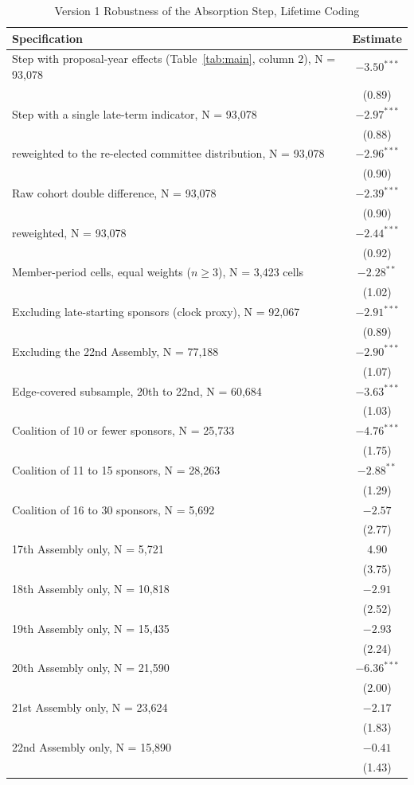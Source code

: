 \documentclass[11pt]{article}
\begin{document}
\begin{table}[H]
\centering
\singlespacing
\caption{Version 1 Robustness of the Absorption Step, Lifetime Coding}
\label{tab:robust}
\small
\begin{tabular}{lc}
\toprule
Specification & Estimate \\
\midrule
Step with proposal-year effects (Table~\ref{tab:main}, column 2), N = 93,078 & $-3.50^{***}$ \\
& (0.89) \\
Step with a single late-term indicator, N = 93,078 & $-2.97^{***}$ \\
& (0.88) \\
\quad reweighted to the re-elected committee distribution, N = 93,078 & $-2.96^{***}$ \\
& (0.90) \\
Raw cohort double difference, N = 93,078 & $-2.39^{***}$ \\
& (0.90) \\
\quad reweighted, N = 93,078 & $-2.44^{***}$ \\
& (0.92) \\
Member-period cells, equal weights ($n \geq 3$), N = 3,423 cells & $-2.28^{**}$ \\
& (1.02) \\
Excluding late-starting sponsors (clock proxy), N = 92,067 & $-2.91^{***}$ \\
& (0.89) \\
Excluding the 22nd Assembly, N = 77,188 & $-2.90^{***}$ \\
& (1.07) \\
Edge-covered subsample, 20th to 22nd, N = 60,684 & $-3.63^{***}$ \\
& (1.03) \\
\midrule
Coalition of 10 or fewer sponsors, N = 25,733 & $-4.76^{***}$ \\
& (1.75) \\
Coalition of 11 to 15 sponsors, N = 28,263 & $-2.88^{**}$ \\
& (1.29) \\
Coalition of 16 to 30 sponsors, N = 5,692 & $-2.57$ \\
& (2.77) \\
\midrule
17th Assembly only, N = 5,721 & $4.90$ \\
& (3.75) \\
18th Assembly only, N = 10,818 & $-2.91$ \\
& (2.52) \\
19th Assembly only, N = 15,435 & $-2.93$ \\
& (2.24) \\
20th Assembly only, N = 21,590 & $-6.36^{***}$ \\
& (2.00) \\
21st Assembly only, N = 23,624 & $-2.17$ \\
& (1.83) \\
22nd Assembly only, N = 15,890 & $-0.41$ \\
& (1.43) \\
\bottomrule
\end{tabular}


\end{table}
\end{document}
